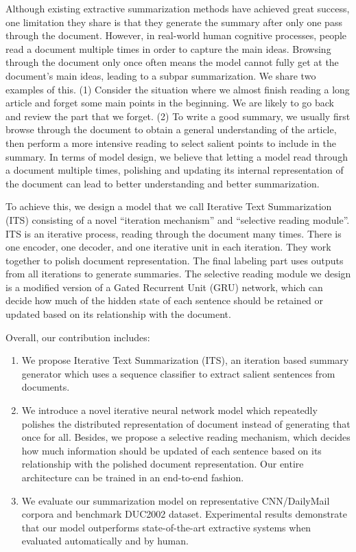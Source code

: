 \documentclass[11pt,a4paper]{article}
\begin{document}
Although existing extractive summarization methods have achieved great success, one limitation they share is that they generate the summary after only one pass through the document.
However, in real-world human cognitive processes, people read a document multiple times in order to capture the main ideas. 
Browsing through the document only once often means the model cannot fully get at the document's main ideas, leading to a subpar summarization. We share two examples of this. (1) Consider the situation where we almost finish reading a long article and forget some main points in the beginning. We are likely to go back and review the part that we forget.
(2) To write a good summary, we usually first browse through the document to obtain a general understanding of the article, then perform a more intensive reading to select salient points to include in the summary. 
In terms of model design, we believe that letting a model read through a document multiple times, polishing and updating its internal representation of the document can lead to better understanding and better summarization.



To achieve this, we design a model that we call Iterative Text Summarization (ITS) consisting of a novel ``iteration mechanism'' and ``selective reading module''.
ITS is an iterative process, reading through the document many times.
There is one encoder, one decoder, and one iterative unit in each iteration. They work together to polish document representation. The final labeling part uses outputs from all iterations to generate summaries.
The selective reading module we design is a modified version of a Gated Recurrent Unit (GRU) network, which can decide how much of the hidden state of each sentence should be retained or updated based on its relationship with the document.

Overall, our contribution includes: 
\begin{enumerate}
	\item  We propose Iterative Text Summarization (ITS), an iteration based summary generator which uses a sequence classifier to extract salient sentences from documents.
	\item We introduce a novel iterative neural network model which repeatedly polishes the distributed representation of document instead of generating that once for all. 
	Besides, we propose a selective reading mechanism, which decides how much information should be updated of each sentence based on its relationship with the polished document representation.
	Our entire architecture can be trained in an end-to-end fashion. 
	\item We evaluate our summarization model on representative CNN/DailyMail corpora and benchmark DUC2002 dataset. Experimental results demonstrate that our model outperforms state-of-the-art extractive systems when evaluated automatically and by human.
	
\end{enumerate}
\end{document}
